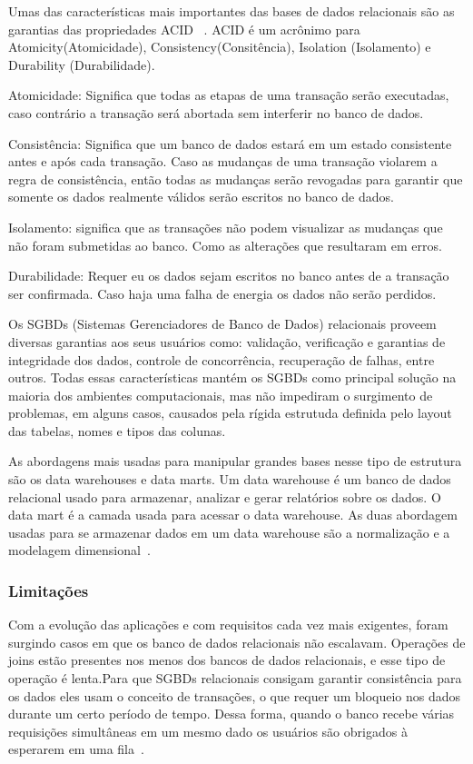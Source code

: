 Umas das características mais importantes das bases de dados relacionais são as garantias das propriedades ACID  ~\cite{Orendanalysisand}. ACID é um acrônimo para Atomicity(Atomicidade), Consistency(Consitência), Isolation (Isolamento) e Durability (Durabilidade).


Atomicidade: Significa que todas as etapas de uma transação serão executadas, caso contrário a transação será abortada sem interferir no banco de dados.

Consistência: Significa que um banco de dados estará em um estado consistente antes e após cada transação. Caso as mudanças de uma transação violarem a regra de consistência, então todas as mudanças serão revogadas para garantir que somente os dados realmente válidos serão escritos no banco de dados.

Isolamento: significa que as transações não podem visualizar as mudanças que não foram submetidas ao banco. Como as alterações que resultaram em erros.

Durabilidade: Requer eu os dados sejam escritos no banco antes de a transação ser confirmada. Caso haja uma falha de energia os dados não serão perdidos.


Os SGBDs (Sistemas Gerenciadores de Banco de Dados) relacionais proveem diversas garantias aos seus usuários como: validação, verificação e garantias de integridade dos dados, controle de concorrência, recuperação de falhas,  entre outros. Todas essas características mantém os SGBDs como principal solução na maioria dos ambientes computacionais, mas não impediram o surgimento de problemas, em alguns casos, causados pela rígida estrutuda definida pelo layout das tabelas, nomes e tipos das colunas.

As abordagens mais usadas para manipular grandes bases nesse tipo de estrutura são os data warehouses e data marts. Um data warehouse é um banco de dados relacional usado para armazenar, analizar e gerar relatórios sobre os dados. O data mart é a camada usada para acessar o data warehouse. As duas abordagem usadas para se armazenar dados em um data warehouse são a normalização e a modelagem dimensional~\cite{bigdataarchitectureandapproach}.

\subsubsection{Limitações}

Com a evolução das aplicações e com requisitos cada vez mais exigentes, foram surgindo casos em que os banco de dados relacionais não escalavam. Operações de joins estão presentes nos menos dos bancos de dados relacionais, e esse tipo de operação é lenta.Para que SGBDs relacionais consigam garantir consistência para os dados eles usam o conceito de transações, o que requer um bloqueio nos dados durante um certo período de tempo.  Dessa forma, quando o banco recebe várias requisições simultâneas em um mesmo dado os usuários são obrigados à esperarem em uma fila~\cite{cassandraguide}.

